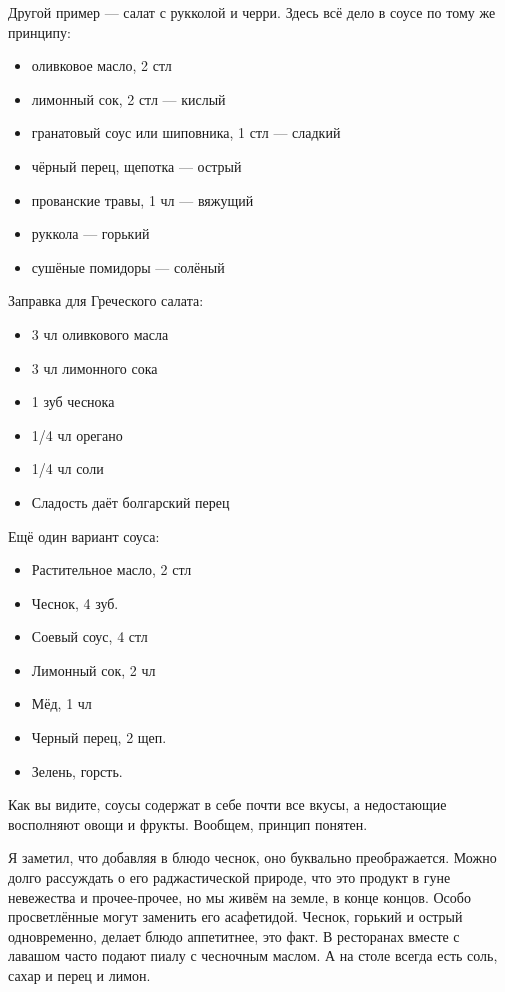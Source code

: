 Другой пример — салат с рукколой и черри. Здесь всё дело в соусе по тому же принципу:
\begin{itemize}
\item оливковое масло, 2 стл
\item лимонный сок, 2 стл — кислый
\item гранатовый соус или шиповника, 1 стл — сладкий
\item чёрный перец, щепотка — острый
\item прованские травы, 1 чл — вяжущий
 
\item руккола — горький
\item сушёные помидоры — солёный
\end{itemize}


Заправка для Греческого салата:
\begin{itemize}
\item 3 чл оливкового масла
\item 3 чл лимонного сока
\item 1 зуб чеснока
\item 1/4 чл орегано
\item 1/4 чл соли
\item Сладость даёт болгарский перец
\end{itemize}

Ещё один вариант соуса:
\begin{itemize}
\item Растительное масло, 2 стл
\item Чеснок, 4 зуб.
\item Соевый соус, 4 стл
\item Лимонный сок, 2 чл
\item Мёд, 1 чл
\item Черный перец, 2 щеп.
\item Зелень, горсть.
\end{itemize}

Как вы видите, соусы содержат в себе почти все вкусы, а недостающие восполняют овощи и фрукты. Вообщем, принцип понятен.

Я заметил, что добавляя в блюдо чеснок, оно буквально преображается. Можно долго рассуждать о его раджастической природе, что это продукт в гуне невежества и прочее-прочее, но мы живём на земле, в конце концов. Особо просветлённые могут заменить его асафетидой. Чеснок, горький и острый одновременно, делает блюдо аппетитнее, это факт. В ресторанах вместе с лавашом часто подают пиалу с чесночным маслом. А на столе всегда есть соль, сахар и перец и лимон.

